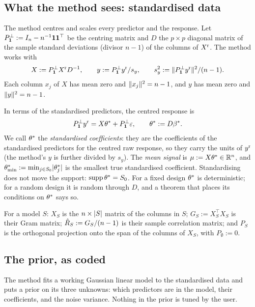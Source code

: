 \subsection{What the method sees: standardised data}\label{sec:standardise}

The method centres and scales every predictor and the response. Let $P^\perp_{\mathbf{1}}:=I_n-n^{-1}\mathbf{1}\mathbf{1}^\top$ be the
centring matrix and $D$ the $p\times p$ diagonal matrix of the sample standard deviations (divisor $n-1$) of the columns
of $X^{\mathrm r}$. The method works with
\begin{equation}\label{eq:standardise}
  X:=P^\perp_{\mathbf{1}}X^{\mathrm r} D^{-1},\qquad
  y:=P^\perp_{\mathbf{1}}y^{\mathrm r}/s_y,\qquad s_y^2:=\lVert P^\perp_{\mathbf{1}}y^{\mathrm r}\rVert^2/(n-1).
\end{equation}
Each column $x_j$ of $X$ has mean zero and $\lVert x_j\rVert^2=n-1$, and $y$ has mean zero and $\lVert y\rVert^2=n-1$.

In terms of the standardised predictors, the centred response is
\[
  P^\perp_{\mathbf{1}}y^{\mathrm r}=X\theta^*+P^\perp_{\mathbf{1}}\varepsilon,\qquad \theta^*:=D\beta^* .
\]
We call $\theta^*$ the \emph{standardised coefficients}: they are the coefficients of the standardised predictors for
the centred raw response, so they carry the units of $y^{\mathrm r}$ (the method's $y$ is further divided by $s_y$). The \emph{mean signal}
is $\mu:=X\theta^*\in\mathbb{R}^n$, and $\theta^*_{\min}:=\min_{j\in S_0}\lvert \theta^*_j\rvert$ is the smallest true standardised coefficient.
Standardising does not move the support: $\operatorname{supp}\theta^*=S_0$. For a fixed design $\theta^*$ is deterministic; for a random
design it is random through $D$, and a theorem that places its conditions on $\theta^*$ says so.

For a model $S$: $X_S$ is the $n\times\lvert S\rvert$ matrix of the columns in $S$; $G_S:=X_S^\top X_S$ is their Gram matrix;
$\hat R_S:=G_S/(n-1)$ is their sample correlation matrix; and $P_S$ is the orthogonal projection onto the span of the
columns of $X_S$, with $P_\emptyset:=0$.

\subsection{The prior, as coded}\label{sec:prior}

The method fits a working Gaussian linear model to the standardised data and puts a prior on its three unknowns: which
predictors are in the model, their coefficients, and the noise variance. Nothing in the prior is tuned by the user.

